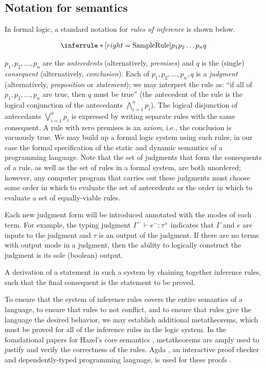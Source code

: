 \subsection{Notation for semantics}
\label{sec:semantics-notation}
In formal logic, a standard notation for \textit{rules of inference} is shown below.
\begin{singlespace}
  \[\Infer{SampleRule}{p_1 \\ p_2 \\ \dots \\ p_n}{q}\]
\end{singlespace}
$p_1,p_2,\dots,p_n$ are the \textit{antecedents} (alternatively, \textit{premises}) and $q$ is the (single) \textit{consequent} (alternatively, \textit{conclusion}). Each of $p_1,p_2,\dots,p_n,q$ is a \textit{judgment} (alternatively, \textit{proposition} or \textit{statement}); we may interpret the rule as: ``if all of $p_1,p_2,\dots,p_n$ are true, then $q$ must be true'' (the antecedent of the rule is the logical conjunction of the antecedants $\bigwedge_{i=1}^n p_i$). The logical disjunction of antecedants $\bigvee_{i=1}^n p_i$ is expressed by writing separate rules with the same consequent. A rule with zero premises is an \textit{axiom}, i.e., the conclusion is vacuously true. We may build up a formal logic system using such rules; in our case the formal specification of the static and dynamic semantics of a programming language. Note that the set of judgments that form the consequents of a rule, as well as the set of rules in a formal system, are both unordered; however, any computer program that carries out these judgments must choose some order in which to evaluate the set of antecedents or the order in which to evaluate a set of equally-viable rules.

Each new judgment form will be introduced annotated with the modes of each term. For example, the typing judgment $\Gamma^-\vdash e^-:\tau^+$ indicates that $\Gamma$ and $e$ are inputs to the judgment and $\tau$ is an output of the judgment. If there are no terms with output mode in a judgment, then the ability to logically construct the judgment is its sole (boolean) output.

A derivation of a statement in such a system by chaining together inference rules, such that the final consequent is the statement to be proved.


To ensure that the system of inference rules covers the entire semantics of a language, to ensure that rules to not conflict, and to ensure that rules give the language the desired behavior, we may establish additional metatheorems, which must be proved for all of the inference rules in the logic system. In the foundational papers for Hazel's core semantics \cite{conf/popl/Hazelnut17,conf/popl/HazelnutLive19}, metatheorems are amply used to justify and verify the correctness of the rules. Agda \cite{bove2009brief}, an interactive proof checker and dependently-typed programming language, is used for these proofs \cite{agda2017,agda-dynamics}.

